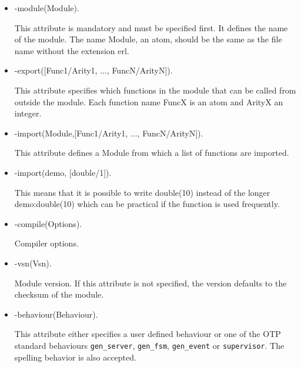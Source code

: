 \begin{itemize}

	\item \begin{erlangim}
	-module(Module).
	\end{erlangim}
	This attribute is mandatory and must be specified first. It
        defines the name of the module. The name Module, an atom,
        should be the same as the file name without the extension erl.

	\item \begin{erlangim}
	-export([Func1/Arity1, ..., FuncN/ArityN]).
	\end{erlangim}
	 This attribute specifies which functions in the module that
         can be called from outside the module. Each function name
         FuncX is an atom and ArityX an integer.

	\item \begin{erlangim}
	-import(Module,[Func1/Arity1, ..., FuncN/ArityN]).
	\end{erlangim}
	This attribute defines a Module from which a list of functions
        are imported.

	\item \begin{erlangim}
	-import(demo, [double/1]).
	\end{erlangim}
	This means that it is possible to write double(10) instead of
        the longer demo:double(10) which can be practical if the
        function is used frequently.

	\item \begin{erlangim}
	-compile(Options).
	\end{erlangim}
	Compiler options.

	\item \begin{erlangim}
	-vsn(Vsn).
	\end{erlangim}
	Module version. If this attribute is not specified, the
        version defaults to the checksum of the module.

	\item \begin{erlangim}
	-behaviour(Behaviour).
	\end{erlangim}
	This attribute either specifies a user defined behaviour or
        one of the OTP standard behaviours \texttt{gen\_server},
        \texttt{gen\_fsm}, \texttt{gen\_event} or
        \texttt{supervisor}. The spelling behavior is also accepted.

\end{itemize}


